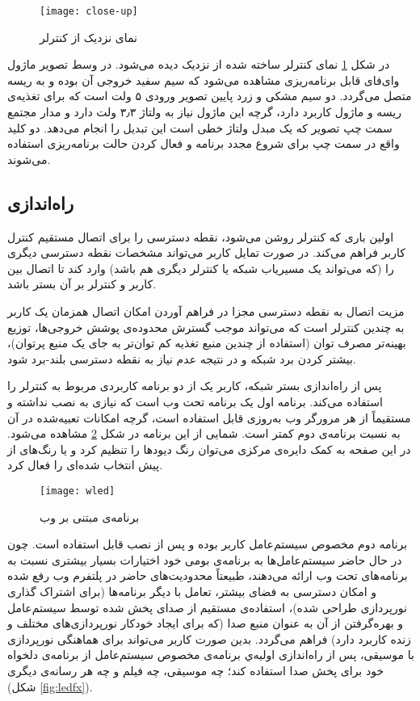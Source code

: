 \documentclass[12pt,twocolumn,a4paper,oneside]{article}
\begin{document}
\begin{figure}[ht]
\centering
\texttt{[image: close-up]}
\caption{نمای نزدیک از کنترلر}
\label{fig:close-up}
\end{figure}

در شکل \ref{fig:close-up} نمای کنترلر ساخته شده از نزدیک دیده می‌شود. در وسط تصویر ماژول وای‌فای قابل برنامه‌ریزی مشاهده می‌شود که سیم سفید خروجی آن بوده و به ریسه متصل می‌گردد. دو سیم مشکی و زرد پایین تصویر ورودی ۵ ولت است که برای تغذیه‌ی ریسه و ماژول کاربرد دارد، گرچه این ماژول نیاز به ولتاژ ۳٫۳ ولت دارد و مدار مجتمع سمت چپ تصویر که یک مبدل ولتاژ خطی است این تبدیل را انجام می‌دهد. دو کلید واقع در سمت چپ برای شروع مجدد برنامه و فعال کردن حالت برنامه‌ریزی استفاده می‌شوند.

\subsection{راه‌اندازی}
اولین باری که کنترلر روشن می‌شود، نقطه دسترسی را برای اتصال مستقیم کنترل کاربر فراهم می‌کند. در صورت تمایل کاربر می‌تواند مشخصات نقطه دسترسی دیگری را (که می‌تواند یک مسیریاب شبکه یا کنترلر دیگری هم باشد) وارد کند تا اتصال بین کاربر و کنترلر بر آن بستر باشد.

مزیت اتصال به نقطه دسترسی مجزا در فراهم آوردن امکان اتصال همزمان یک کاربر به چندین کنترلر است که می‌تواند موجب گسترش محدوده‌ی پوشش خروجی‌ها، توزیع بهینه‌تر مصرف توان (استفاده از چندین منبع تغذیه کم توان‌تر به جای یک منبع پرتوان)، بیشتر کردن برد شبکه و در نتیجه عدم نیاز به نقطه دسترسی بلند-برد شود.

پس از راه‌اندازی بستر شبکه، کاربر یک از دو برنامه کاربردی مربوط به کنترلر را استفاده می‌کند. برنامه اول یک برنامه تحت وب است که نیازی به نصب نداشته و مستقیماً از هر مرورگر وب به‌روزی قابل استفاده است، گرچه امکانات تعبیه‌شده در آن به نسبت برنامه‌ی دوم کمتر است. شمایی از این برنامه در شکل \ref{fig:wled}‌ مشاهده می‌شود. در این صفحه به کمک دایره‌ی مرکزی می‌توان رنگ دیودها را تنظیم کرد و یا رنگ‌های از پیش انتخاب شده‌ای را فعال کرد.

\begin{figure}[ht]
\centering
\texttt{[image: wled]}
\caption{برنامه‌ی مبتنی بر وب}
\label{fig:wled}
\end{figure}

برنامه دوم مخصوص سیستم‌عامل کاربر بوده و پس از نصب قابل استفاده است. چون در حال حاضر سیستم‌عامل‌ها به برنامه‌ی بومی خود اختیارات بسیار بیشتری نسبت به برنامه‌های تحت وب ارائه می‌دهند، طبیعتاً محدودیت‌های حاضر در پلتفرم وب رفع شده و امکان دسترسی به فضای بیشتر، تعامل با دیگر برنامه‌ها (برای اشتراک گذاری نورپردازی طراحی شده)، استفاده‌ی مستقیم از صدای پخش شده توسط سیستم‌عامل و بهره‌گرفتن از آن به عنوان منبع صدا (که برای ایجاد خودکار نورپردازی‌های مختلف و زنده کاربرد دارد) فراهم می‌گردد. بدین صورت کاربر می‌تواند برای هماهنگی نورپردازی با موسیقی، پس از راه‌اندازی اولیه‌ي برنامه‌ی مخصوص سیستم‌عامل از برنامه‌ی دلخواه خود برای پخش صدا استفاده کند؛ چه موسیقی، چه فیلم و چه هر رسانه‌ی دیگری (شکل \ref{fig:ledfx}).
\end{document}
